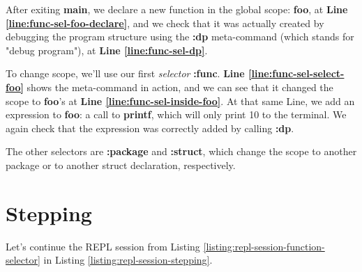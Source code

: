 \documentclass[11pt,fleqn,openany]{book} %
\begin{document}
After exiting \textbf{main}, we declare a new function in the global scope: \textbf{foo}, at \textbf{Line \ref{line:func-sel-foo-declare}}, and we check that it was actually created by debugging the program structure using the \textbf{:dp} meta-command (which stands for "debug program"), at \textbf{Line \ref{line:func-sel-dp}}.

To change scope, we'll use our first \emph{selector} \textbf{:func}. \textbf{Line \ref{line:func-sel-select-foo}} shows the meta-command in action, and we can see that it changed the scope to \textbf{foo}'s at \textbf{Line \ref{line:func-sel-inside-foo}}. At that same Line, we add an expression to \textbf{foo}: a call to \textbf{printf}, which will only print 10 to the terminal. We again check that the expression was correctly added by calling \textbf{:dp}.

The other selectors are \textbf{:package} and \textbf{:struct}, which change the scope to another package or to another struct declaration, respectively.

\section{Stepping}

Let's continue the REPL session from Listing \ref{listing:repl-session-function-selector} in Listing \ref{listing:repl-session-stepping}.
\end{document}
